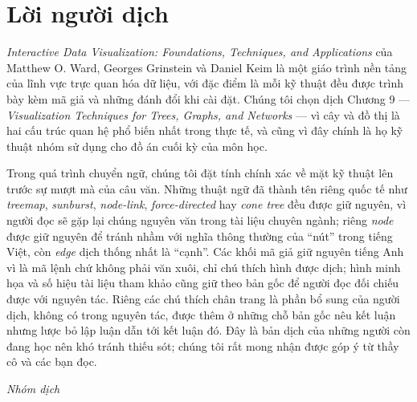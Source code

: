 \documentclass[12pt,a4paper, openany]{book}
\begin{document}
\frontmatter
\tableofcontents

\chapter*{Lời người dịch}

\textit{Interactive Data Visualization: Foundations, Techniques, and Applications} của Matthew O. Ward, Georges Grinstein và Daniel Keim là một giáo trình nền tảng của lĩnh vực trực quan hóa dữ liệu, với đặc điểm là mỗi kỹ thuật đều được trình bày kèm mã giả và những đánh đổi khi cài đặt. Chúng tôi chọn dịch Chương 9 --- \textit{Visualization Techniques for Trees, Graphs, and Networks} --- vì cây và đồ thị là hai cấu trúc quan hệ phổ biến nhất trong thực tế, và cũng vì đây chính là họ kỹ thuật nhóm sử dụng cho đồ án cuối kỳ của môn học.

Trong quá trình chuyển ngữ, chúng tôi đặt tính chính xác về mặt kỹ thuật lên trước sự mượt mà của câu văn. Những thuật ngữ đã thành tên riêng quốc tế như \textit{treemap}, \textit{sunburst}, \textit{node-link}, \textit{force-directed} hay \textit{cone tree} đều được giữ nguyên, vì người đọc sẽ gặp lại chúng nguyên văn trong tài liệu chuyên ngành; riêng \textit{node} được giữ nguyên để tránh nhầm với nghĩa thông thường của ``nút'' trong tiếng Việt, còn \textit{edge} dịch thống nhất là ``cạnh''. Các khối mã giả giữ nguyên tiếng Anh vì là mã lệnh chứ không phải văn xuôi, chỉ chú thích hình được dịch; hình minh họa và số hiệu tài liệu tham khảo cũng giữ theo bản gốc để người đọc đối chiếu được với nguyên tác. Riêng các chú thích chân trang là phần bổ sung của người dịch, không có trong nguyên tác, được thêm ở những chỗ bản gốc nêu kết luận nhưng lược bỏ lập luận dẫn tới kết luận đó. Đây là bản dịch của những người còn đang học nên khó tránh thiếu sót; chúng tôi rất mong nhận được góp ý từ thầy cô và các bạn đọc.

\vspace{0.8cm}
\begin{flushright}
    \textit{Nhóm dịch}
\end{flushright}

\mainmatter
\end{document}
